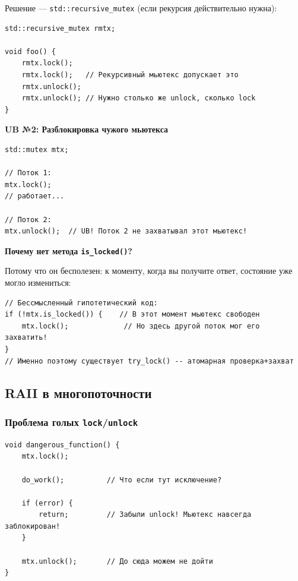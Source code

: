 \documentclass[a4paper,12pt]{article}
\begin{document}
Решение --- \texttt{std::recursive\_mutex} (если рекурсия действительно нужна):

\begin{lstlisting}
std::recursive_mutex rmtx;

void foo() {
    rmtx.lock();
    rmtx.lock();   // Рекурсивный мьютекс допускает это
    rmtx.unlock();
    rmtx.unlock(); // Нужно столько же unlock, сколько lock
}
\end{lstlisting}

\textbf{UB №2: Разблокировка чужого мьютекса}

\begin{lstlisting}
std::mutex mtx;

// Поток 1:
mtx.lock();
// работает...

// Поток 2:
mtx.unlock();  // UB! Поток 2 не захватывал этот мьютекс!
\end{lstlisting}

\textbf{Почему нет метода \texttt{is\_locked()}?}

Потому что он бесполезен: к моменту, когда вы получите ответ, состояние уже
могло измениться:

\begin{lstlisting}
// Бессмысленный гипотетический код:
if (!mtx.is_locked()) {    // В этот момент мьютекс свободен
    mtx.lock();             // Но здесь другой поток мог его захватить!
}
// Именно поэтому существует try_lock() -- атомарная проверка+захват
\end{lstlisting}

\subsection{RAII в многопоточности}

\subsubsection{Проблема голых \texttt{lock}/\texttt{unlock}}

\begin{lstlisting}
void dangerous_function() {
    mtx.lock();

    do_work();          // Что если тут исключение?

    if (error) {
        return;         // Забыли unlock! Мьютекс навсегда заблокирован!
    }

    mtx.unlock();       // До сюда можем не дойти
}
\end{lstlisting}
\end{document}
